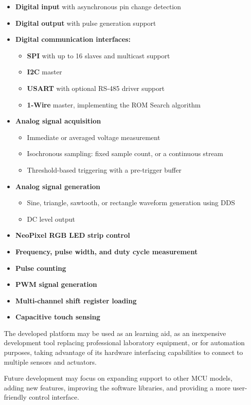 \begin{itemize}[itemsep=1pt]
	\item \textbf{Digital input} with asynchronous pin change detection
	\item \textbf{Digital output} with pulse generation support
	\item \textbf{Digital communication interfaces:}
\begin{itemize}
\item \textbf{\gls{SPI}} with up to 16 slaves and multicast support
\item \textbf{\gls{I2C}} master
\item \textbf{\gls{USART}} with optional RS-485 driver support
\item \textbf{1-Wire} master, implementing the \gls{ROM} Search algorithm
\end{itemize}
	\item \textbf{Analog signal acquisition}
		\begin{itemize}
			\item Immediate or averaged voltage measurement
			\item Isochronous sampling: fixed sample count, or a continuous stream
			\item Threshold-based triggering with a pre-trigger buffer
		\end{itemize}
	\item \textbf{Analog signal generation}
		\begin{itemize}
			\item Sine, triangle, sawtooth, or rectangle waveform generation using \gls{DDS}
			\item \gls{DC} level output
		\end{itemize}
	\item \textbf{NeoPixel RGB \gls{LED} strip control}
\item \textbf{Frequency, pulse width, and duty cycle measurement}
\item \textbf{Pulse counting}
\item \textbf{\gls{PWM} signal generation}	
\item \textbf{Multi-channel shift register loading}
\item \textbf{Capacitive touch sensing}
\end{itemize}

The developed platform may be used as an learning aid, as an inexpensive development tool replacing professional laboratory equipment, or for automation purposes, taking advantage of its hardware interfacing capabilities to connect to multiple sensors and actuators.

Future development may focus on expanding support to other \gls{MCU} models, adding new features, improving the software libraries, and providing a more user-friendly control interface.

